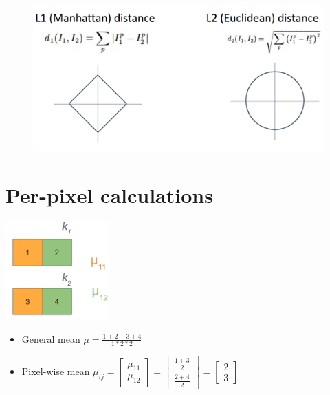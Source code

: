 \documentclass{article}
\begin{document}
\begin{figure}[htp]
    \centering
    \includegraphics[width=12cm, scale=1]{images/L1_vs_L2_distance.PNG}
    \caption{}
\end{figure}


\section{Per-pixel calculations}
\begin{minipage}[c]{0.5\textwidth}
    \vspace{0pt}
    \includegraphics[width=4cm, scale=1]{images/knn_inlineQ2.PNG}
    \captionsetup{justification=centering}
\end{minipage}%
\begin{minipage}[c]{0.5\textwidth}
    \vspace{0pt}
    \begin{itemize}
        \item General mean $\mu = \frac{1+2+3+4}{1*2*2}$
        \vspace{0.5cm}
        \item Pixel-wise mean $\mu_{ij} = 
            \begin{bmatrix}
                \mu_{11} \\
                \mu_{12}
            \end{bmatrix} = 
            \begin{bmatrix}
                \frac{1+3}{2} \\
                \frac{2+4}{2}
            \end{bmatrix} = 
            \begin{bmatrix}
                2 \\
                3
            \end{bmatrix}$
    \end{itemize}
\end{minipage}
\end{document}
